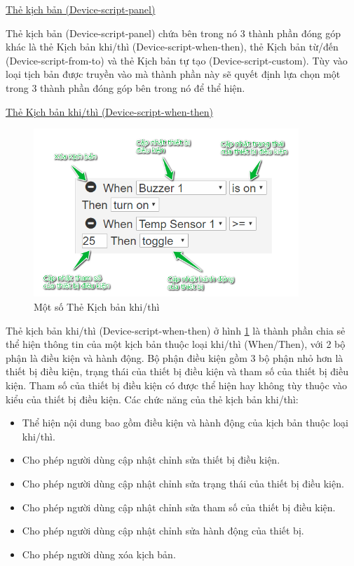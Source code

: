\documentclass[12pt,a4paper,oneside]{extbook}
\begin{document}
\underline{Thẻ kịch bản (Device-script-panel)}

Thẻ kịch bản (Device-script-panel) chứa bên trong nó 3 thành phần đóng góp khác là thẻ Kịch bản khi/thì (Device-script-when-then), thẻ Kịch bản từ/đến (Device-script-from-to) và thẻ Kịch bản tự tạo (Device-script-custom). Tùy vào loại tịch bản được truyền vào mà thành phần này sẽ quyết định lựa chọn một trong 3 thành phần đóng góp bên trong nó để thể hiện.

\underline{Thẻ Kịch bản khi/thì (Device-script-when-then)}

\begin{figure}[h]
  \centering
     \includegraphics[width=10cm]{6-device-script-when-then}
  \caption{Một số Thẻ Kịch bản khi/thì}\label{fig:6-device-script-when-then}
\end{figure}

Thẻ kịch bản khi/thì (Device-script-when-then) ở hình \ref{fig:6-device-script-when-then} là thành phần chia sẻ thể hiện thông tin của một kịch bản thuộc loại khi/thì (When/Then), với 2 bộ phận là điều kiện và hành động. Bộ phận điều kiện gồm 3 bộ phận nhỏ hơn là thiết bị điều kiện, trạng thái của thiết bị điều kiện và tham số của thiết bị điều kiện. Tham số của thiết bị điều kiện có được thể hiện hay không tùy thuộc vào kiểu của thiết bị điều kiện. Các chức năng của thẻ kịch bản khi/thì:

\begin{itemize}[topsep=1mm,itemsep=-0.5mm]
\item Thể hiện nội dung bao gồm điều kiện và hành động của kịch bản thuộc loại khi/thì.
\item Cho phép người dùng cập nhật chỉnh sửa thiết bị điều kiện.
\item Cho phép người dùng cập nhật chỉnh sửa trạng thái của thiết bị điều kiện.
\item Cho phép người dùng cập nhật chỉnh sửa tham số của thiết bị điều kiện.
\item Cho phép người dùng cập nhật chỉnh sửa hành động của thiết bị.
\item Cho phép người dùng xóa kịch bản.
\vspace{1mm}
\end{itemize}
\end{document}
